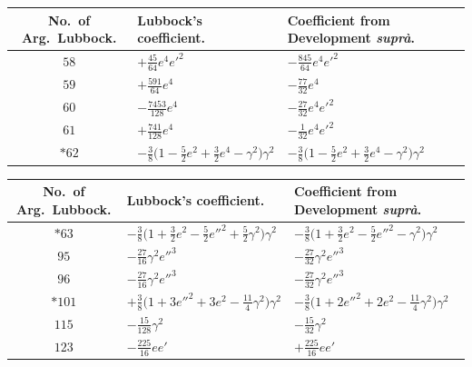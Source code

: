 \documentclass[12pt,a4paper]{article}
\theoremstyle{plain}
\begin{document}
\begin{center}
\small
\begin{tabular}{|c|l|l|}
\hline
No.\ of Arg.\ Lubbock. & Lubbock's coefficient. & Coefficient from Development \textit{supr\`a}. \\
\hline
$58$  & $+\tfrac{45}{64}e^{4}e'^{2}$              & $-\tfrac{845}{64}e^{4}e'^{2}$ \\
$59$  & $+\tfrac{591}{64}e^{4}$                   & $-\tfrac{77}{32}e^{4}$ \\
$60$  & $-\tfrac{7453}{128}e^{4}$                 & $-\tfrac{27}{32}e^{4}e'^{2}$ \\
$61$  & $+\tfrac{741}{128}e^{4}$                  & $-\tfrac{1}{32}e^{4}e'^{2}$ \\
$*62$ & $-\tfrac{3}{8}\bigl(1-\tfrac{5}{2}e^{2}+\tfrac{3}{2}e^{4}-\gamma^{2}\bigr)\gamma^{2}$
                                                   & $-\tfrac{3}{8}\bigl(1-\tfrac{5}{2}e^{2}+\tfrac{3}{2}e^{4}-\gamma^{2}\bigr)\gamma^{2}$ \\
\hline
\end{tabular}
\end{center}

\newpage
{}

\begin{center}
\small
\begin{tabular}{|c|l|l|}
\hline
No.\ of Arg.\ Lubbock. & Lubbock's coefficient. & Coefficient from Development \textit{supr\`a}. \\
\hline
$*63$ & $-\tfrac{3}{8}\bigl(1+\tfrac{3}{2}e^{2}-\tfrac{5}{2}e''^{2}+\tfrac{5}{2}\gamma^{2}\bigr)\gamma^{2}$
       & $-\tfrac{3}{8}\bigl(1+\tfrac{3}{2}e^{2}-\tfrac{5}{2}e''^{2}-\gamma^{2}\bigr)\gamma^{2}$ \\
$95$  & $-\tfrac{27}{16}\gamma^{2}e''^{3}$        & $-\tfrac{27}{32}\gamma^{2}e''^{3}$ \\
$96$  & $-\tfrac{27}{16}\gamma^{2}e''^{3}$        & $-\tfrac{27}{32}\gamma^{2}e''^{3}$ \\
$*101$ & $+\tfrac{3}{8}\bigl(1+3e''^{2}+3e^{2}-\tfrac{11}{4}\gamma^{2}\bigr)\gamma^{2}$
       & $-\tfrac{3}{8}\bigl(1+2e''^{2}+2e^{2}-\tfrac{11}{4}\gamma^{2}\bigr)\gamma^{2}$ \\
$115$ & $-\tfrac{15}{128}\gamma^{2}$              & $-\tfrac{15}{32}\gamma^{2}$ \\
$123$ & $-\tfrac{225}{16}e e'$                    & $+\tfrac{225}{16}e e'$ \\
\hline
\end{tabular}
\end{center}
\end{document}
